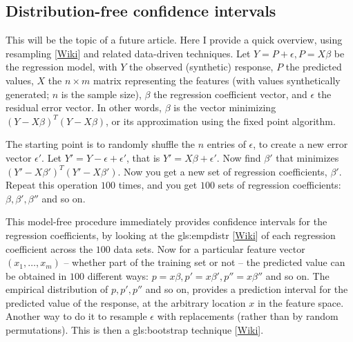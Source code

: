 \documentclass[oneside,10pt]{book}
\begin{document}
\subsection{Distribution-free confidence intervals}\label{rdfci}

This will be the topic of a future article. Here I provide a quick overview, using \textcolor{index}{resampling} [\href{https://en.wikipedia.org/wiki/Resampling_(statistics)}{Wiki}] and related data-driven techniques. Let $Y=P+\epsilon, P=X\beta$ be the regression model, with $Y$ the observed (synthetic) response, $P$ the predicted values, $X$ the $n\times m$ matrix
representing the features (with values synthetically generated; $n$ is the sample size), $\beta$ the regression coefficient vector, and $\epsilon$ the residual error vector. In other words, $\beta$ is the vector minimizing $(Y-X\beta)^T(Y-X\beta)$, or its approximation using the fixed point algorithm.

The starting point is to randomly shuffle the $n$ entries of $\epsilon$, to create a new error vector $\epsilon'$. Let $Y'=Y-\epsilon+\epsilon'$, that is  $Y'=X\beta+\epsilon'$. Now find $\beta'$ that minimizes
$(Y'-X\beta')^T(Y'-X\beta')$. Now you get a new set of regression coefficients, $\beta'$. Repeat this operation $100$ times, and you get $100$ sets of regression coefficients: $\beta, \beta', \beta''$ and so on.

This model-free procedure immediately provides confidence intervals for the regression coefficients, by looking at the
\gls{gls:empdistr}
 [\href{https://en.wikipedia.org/wiki/Empirical_distribution_function}{Wiki}] of each regression coefficient across the $100$ data sets. Now for a particular feature vector $(x_1,\dots,x_m)$ -- whether part of the training set or not -- the predicted value can be obtained in $100$ different ways: $p=x\beta, p'=x\beta', p''=x\beta''$ and so on. The empirical distribution of $p,p',p''$ and so on, provides a \textcolor{index}{prediction interval} for the predicted value of the response, at the arbitrary location $x$ in the feature space. Another way to do it to resample $\epsilon$ with replacements (rather than by random permutations). This is then a \gls{gls:bootstrap} technique [\href{https://en.wikipedia.org/wiki/Bootstrapping_(statistics)}{Wiki}].
\end{document}
